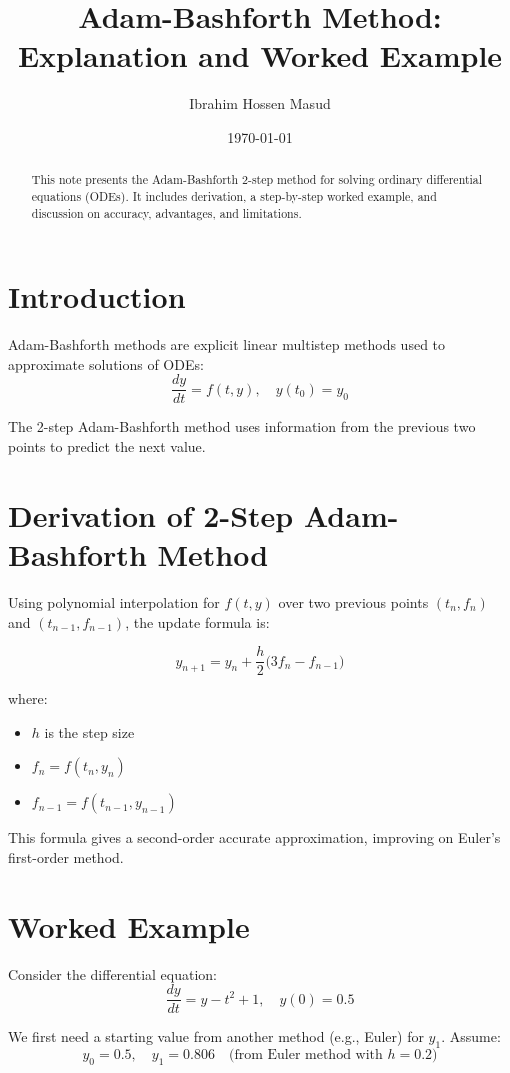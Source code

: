 \documentclass[11pt,a4paper]{article}
\title{Adam-Bashforth Method: Explanation and Worked Example}
\author{Ibrahim Hossen Masud}
\date{\today}
\begin{document}
\maketitle

\begin{abstract}
This note presents the Adam-Bashforth 2-step method for solving ordinary differential equations (ODEs). 
It includes derivation, a step-by-step worked example, and discussion on accuracy, advantages, and limitations.
\end{abstract}

\section{Introduction}
Adam-Bashforth methods are explicit linear multistep methods used to approximate solutions of ODEs:
\[
\frac{dy}{dt} = f(t,y), \quad y(t_0) = y_0
\]

The 2-step Adam-Bashforth method uses information from the previous two points to predict the next value.

\section{Derivation of 2-Step Adam-Bashforth Method}
Using polynomial interpolation for $f(t,y)$ over two previous points $(t_n, f_n)$ and $(t_{n-1}, f_{n-1})$, the update formula is:

\[
y_{n+1} = y_n + \frac{h}{2} \big( 3 f_n - f_{n-1} \big)
\]

where:
\begin{itemize}
    \item $h$ is the step size  
    \item $f_n = f(t_n, y_n)$  
    \item $f_{n-1} = f(t_{n-1}, y_{n-1})$  
\end{itemize}

This formula gives a second-order accurate approximation, improving on Euler’s first-order method.

\section{Worked Example}
Consider the differential equation:
\[
\frac{dy}{dt} = y - t^2 + 1, \quad y(0) = 0.5
\]

We first need a starting value from another method (e.g., Euler) for $y_1$. Assume:
\[
y_0 = 0.5, \quad y_1 = 0.806 \quad \text{(from Euler method with $h=0.2$)}
\]
\end{document}
